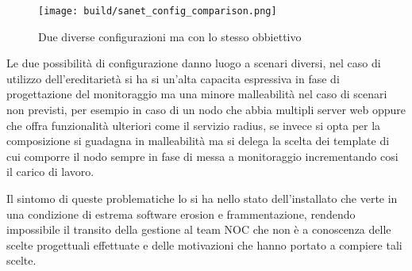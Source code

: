 \begin{figure}[H]
    \centering
    \texttt{[image: build/sanet\_config\_comparison.png]}
    \caption{Due diverse configurazioni ma con lo stesso obbiettivo}
    \label{fig:enter-label}
\end{figure}

Le due possibilità di configurazione danno luogo a scenari diversi, nel caso di utilizzo dell'ereditarietà si ha si un'alta capacita espressiva in fase di progettazione del monitoraggio ma una minore malleabilità nel caso di scenari non previsti, per esempio in caso di un nodo che abbia multipli server web oppure che offra funzionalità ulteriori come il servizio radius, se invece si opta per la composizione si guadagna in malleabilità ma si delega la scelta dei template di cui comporre il nodo sempre in fase di messa a monitoraggio incrementando cosi il carico di lavoro.

Il sintomo di queste problematiche lo si ha nello stato dell'installato che verte in una condizione di estrema software erosion e frammentazione, rendendo impossibile il transito della gestione al team NOC che non è a conoscenza delle scelte progettuali effettuate e delle motivazioni che hanno portato a compiere tali scelte.
